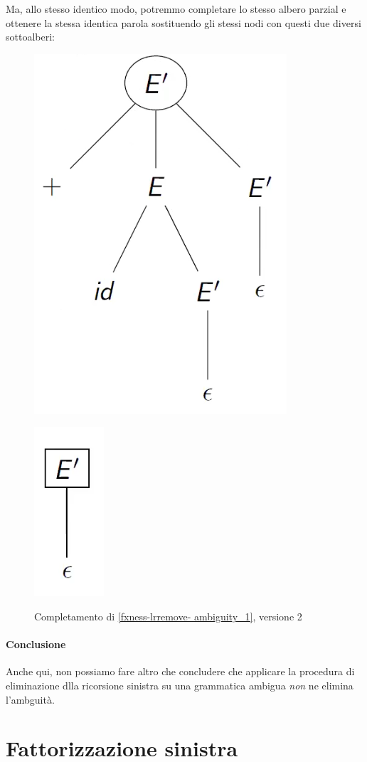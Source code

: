\documentclass[class=book, crop=false, oneside, 12pt]{standalone}
\begin{document}
Ma, allo stesso identico modo, potremmo completare lo stesso albero parzial e ottenere la stessa identica parola sostituendo gli stessi nodi con questi due diversi sottoalberi:
\begin{figure}[H]
    \begin{minipage}[b]{0.4\textwidth}
        \centering
        \includegraphics[width=.35\textwidth,keepaspectratio]{fxness-lrremove-ambiguity_3_1.png}
        \subcaption{}
        \label{fxness-lrremove- ambiguity_3_1}
    \end{minipage}
    \hfill
    \begin{minipage}[b]{0.4\textwidth}
        \centering
        \includegraphics[width=.15\textwidth,keepaspectratio]{fxness-lrremove-ambiguity_3_2.png}
        \subcaption{}
        \label{fxness-lrremove- ambiguity_3_2}
    \end{minipage}
    \caption{Completamento di \ref{fxness-lrremove- ambiguity_1}, versione 2}
    \label{fxness-lrremove- ambiguity_3}
\end{figure}

\paragraph{Conclusione}
Anche qui, non possiamo fare altro che concludere che applicare la procedura di eliminazione dlla ricorsione sinistra su una grammatica ambigua \emph{non} ne elimina l'ambguità.

\section{Fattorizzazione sinistra}
\end{document}
